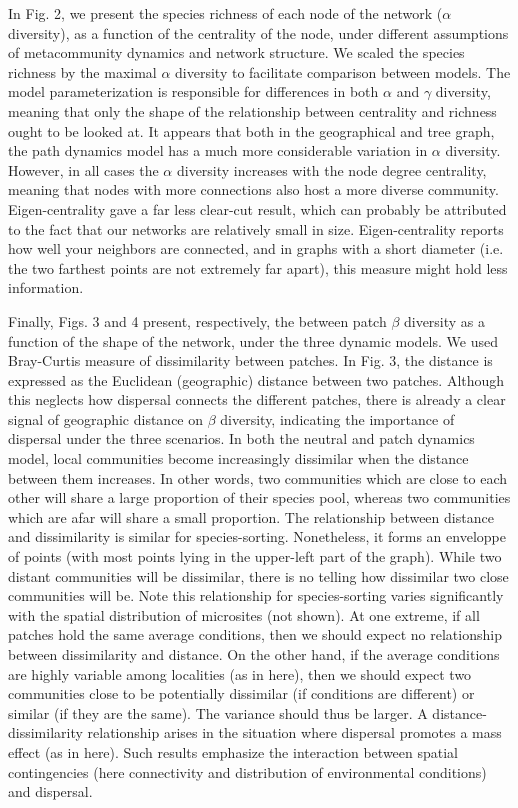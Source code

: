 \documentclass[12pt]{article}
\begin{document}
In Fig. 2, we present the species richness of each node of the network ($\alpha$
diversity), as a function of the centrality of the node, under different
assumptions of metacommunity dynamics and network structure. We scaled the
species richness by the maximal $\alpha$ diversity to facilitate comparison
between models. The model parameterization is responsible for differences in
both $\alpha$ and $\gamma$ diversity, meaning that only the shape of the
relationship between centrality and richness ought to be looked at. It appears
that both in the geographical and tree graph, the path dynamics model has a
much more considerable variation in $\alpha$ diversity. However, in all
cases the $\alpha$ diversity increases with the node degree centrality, meaning
that nodes with more connections also host a more diverse community.
Eigen-centrality gave a far less clear-cut result, which can probably be
attributed to the fact that our networks are relatively small in size.
Eigen-centrality reports how well your neighbors are connected, and in graphs
with a short diameter (i.e. the two farthest points are not extremely far
apart), this measure might hold less information.

Finally, Figs. 3 and 4 present, respectively, the between patch $\beta$
diversity as a function of the shape of the network, under the three dynamic
models. We used Bray-Curtis measure of dissimilarity between patches. In Fig. 3,
the distance is expressed as the Euclidean (geographic) distance between two
patches. Although this neglects how dispersal connects the different patches,
there is already a clear signal of geographic distance on $\beta$ diversity,
indicating the importance of dispersal under the three scenarios. In both the
neutral and patch dynamics model, local communities become increasingly
dissimilar when the distance between them increases. In other words, two
communities which are close to each other will share a large proportion of their
species pool, whereas two communities which are afar will share a small
proportion. The relationship between distance and dissimilarity is similar for
species-sorting. Nonetheless, it forms an enveloppe of points (with most points
lying in the upper-left part of the graph). While two distant communities will
be dissimilar, there is no telling how dissimilar two close communities will be.
Note this relationship for species-sorting varies significantly with the spatial
distribution of microsites (not shown). At one extreme, if all patches hold the
same average conditions, then we should expect no relationship between
dissimilarity and distance. On the other hand, if the average conditions are
highly variable among localities (as in here), then we should expect two
communities close to be potentially dissimilar (if conditions are different) or
similar (if they are the same). The variance should thus be larger. A
distance-dissimilarity relationship arises in the situation where dispersal
promotes a mass effect (as in here). Such results emphasize the interaction
between spatial contingencies (here connectivity and distribution of
environmental conditions) and dispersal.
\end{document}
